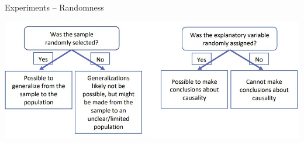 \documentclass{beamer}
\begin{document}
\begin{frame}{Experiments -- Randomness}
\begin{center}
    \includegraphics[scale=.7]{img/experiments_conclusions.jpg}
\end{center}
\end{frame}
\end{document}
